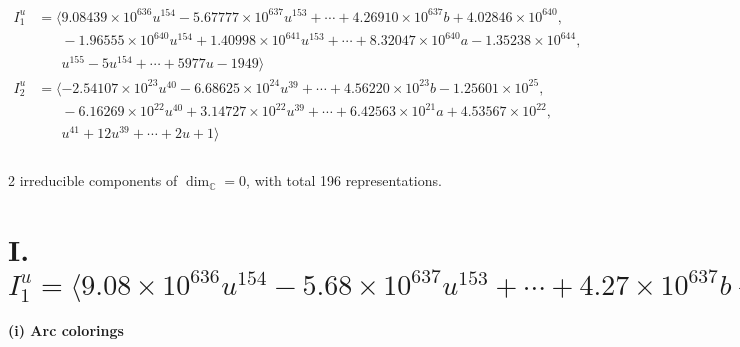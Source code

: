 \documentclass[1p]{elsarticle_modified}
\theoremstyle{definition}
\begin{document}
\begin{align*}
I^u_{1}&=\langle 
9.08439\times10^{636} u^{154}-5.67777\times10^{637} u^{153}+\cdots+4.26910\times10^{637} b+4.02846\times10^{640},\\
\phantom{I^u_{1}}&\phantom{= \langle  }-1.96555\times10^{640} u^{154}+1.40998\times10^{641} u^{153}+\cdots+8.32047\times10^{640} a-1.35238\times10^{644},\\
\phantom{I^u_{1}}&\phantom{= \langle  }u^{155}-5 u^{154}+\cdots+5977 u-1949\rangle \\
I^u_{2}&=\langle 
-2.54107\times10^{23} u^{40}-6.68625\times10^{24} u^{39}+\cdots+4.56220\times10^{23} b-1.25601\times10^{25},\\
\phantom{I^u_{2}}&\phantom{= \langle  }-6.16269\times10^{22} u^{40}+3.14727\times10^{22} u^{39}+\cdots+6.42563\times10^{21} a+4.53567\times10^{22},\\
\phantom{I^u_{2}}&\phantom{= \langle  }u^{41}+12 u^{39}+\cdots+2 u+1\rangle \\
\\
\end{align*}
\raggedright * 2 irreducible components of $\dim_{\mathbb{C}}=0$, with total 196 representations.\\
\newpage
\renewcommand{\arraystretch}{1}
\centering \section*{I. $I^u_{1}= \langle 9.08\times10^{636} u^{154}-5.68\times10^{637} u^{153}+\cdots+4.27\times10^{637} b+4.03\times10^{640},\;-1.97\times10^{640} u^{154}+1.41\times10^{641} u^{153}+\cdots+8.32\times10^{640} a-1.35\times10^{644},\;u^{155}-5 u^{154}+\cdots+5977 u-1949 \rangle$}
\flushleft \textbf{(i) Arc colorings}\\
\end{document}
